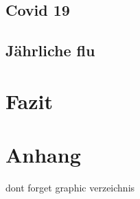 \documentclass[12pt]{scrartcl} %
\begin{document}
\subsection{Covid 19}


\subsection{Jährliche flu}

\newpage %
\section{Fazit}


\newpage
\section{Anhang}

dont forget graphic verzeichnis


\newpage
\setlength{\bibitemsep}{\baselineskip}
\printbibliography[heading=bibintoc]
\end{document}
